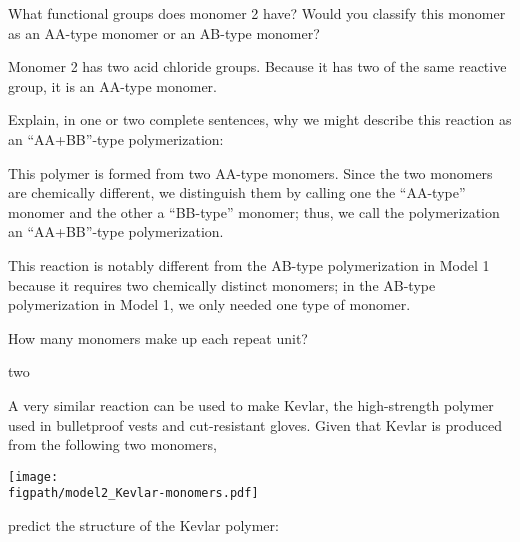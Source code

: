 \begin{activity}
\begin{ctqs}
		\question What functional groups does monomer 2 have?   Would you classify this monomer as an AA-type monomer or an AB-type monomer?
			
				\begin{solution}[0.75in]
					Monomer 2 has two acid chloride groups.  Because it has two of the same reactive group, it is an AA-type monomer.
				\end{solution}
		
		\question Explain, in one or two complete sentences, why we might describe this reaction as an ``AA+BB''-type polymerization:
			
				\begin{solution}[1.75in]
					This polymer is formed from two AA-type monomers.  Since the two monomers are chemically different, we distinguish them by calling one the ``AA-type'' monomer and the other a ``BB-type'' monomer; thus, we call the polymerization an ``AA+BB''-type polymerization.
					
					This reaction is notably different from the AB-type polymerization in Model 1 because it requires two chemically distinct monomers; in the AB-type polymerization in Model 1, we only needed one type of monomer.
				\end{solution}
		
		\question How many monomers make up each repeat unit?
			
				\begin{solution}[1in]
					two
				\end{solution}
		
		\question A very similar reaction can be used to make Kevlar, the high-strength polymer used in bulletproof vests and cut-resistant gloves.  Given that Kevlar is produced from the following two monomers,
		
	
	\centerline{\texttt{[image: \\figpath/model2\_Kevlar-monomers.pdf]}}
		
		predict the structure of the Kevlar polymer:
			
				\begin{solution}[2.5in]
				\end{solution}
		

\end{ctqs}
\end{activity}
